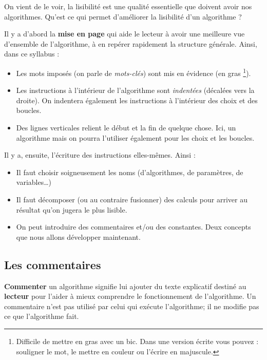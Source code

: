 		On vient de le voir, la lisibilité est une qualité essentielle
		que doivent avoir nos algorithmes.
		Qu'est ce qui permet d'améliorer la lisibilité d'un algorithme ?
		
		Il y a d'abord la \textbf{mise en page} qui aide le lecteur
		à avoir une meilleure vue d'ensemble de l'algorithme,
		à en repérer rapidement la structure générale.
		Ainsi, dans ce syllabus :
		\begin{itemize}
		\item 
			Les mots imposés 
			(on parle de \emph{mots-clés})
			sont mis en évidence (en gras%
			\footnote{%
				Difficile de mettre en gras avec un bic.
				Dans une version écrite vous pouvez :
				souligner le mot, le mettre en couleur ou
				l'écrire en majuscule.%
			}).
		\item
			Les instructions à l'intérieur de l'algorithme sont 
			\emph{indentées}
			(décalées vers la droite).
			On indentera également les instructions
			à l'intérieur des choix et des boucles.
		\item
			Des lignes verticales relient le début et la fin
			de quelque chose. 
			Ici, un algorithme mais on pourra l'utiliser
			également pour les choix et les boucles. 
		\end{itemize}
		
		Il y a, ensuite, l'écriture des instructions elles-mêmes.
		Ainsi :
		\begin{itemize}
		\item
			Il faut choisir soigneusement les noms 
			(d'algorithmes, de paramètres, de variables\dots)
		\item
			Il faut décomposer (ou au contraire fusionner)
			des calculs pour arriver au résultat qu'on jugera
			le plus lisible.
		\item 
			On peut introduire des commentaires et/ou
			des constantes. 
			Deux concepts que nous allons développer maintenant.
		\end{itemize}
			
		\subsection{Les commentaires}
	
			\textbf{Commenter} un algorithme
			signifie lui ajouter du texte explicatif
			destiné au \textbf{lecteur} pour l'aider à mieux
			comprendre le fonctionnement de l'algorithme.
			Un commentaire n'est pas utilisé par celui qui exécute
			l'algorithme; il ne modifie pas ce que l'algorithme fait.
			

